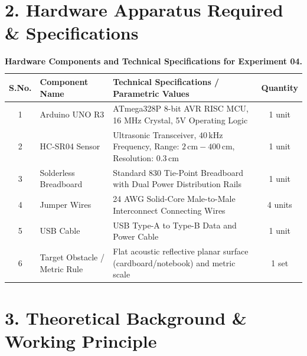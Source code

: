 \documentclass[10pt,a4paper]{article}
\begin{document}
\section*{2. Hardware Apparatus Required \& Specifications}
\begin{table}[H]
\centering
\footnotesize
\renewcommand{\arraystretch}{1.15}
\begin{tabularx}{\textwidth}{|c|l|X|c|}
\hline
\textbf{S.No.} & \textbf{Component Name} & \textbf{Technical Specifications / Parametric Values} & \textbf{Quantity} \\
\hline
1 & Arduino UNO R3 & ATmega328P 8-bit AVR RISC MCU, 16 MHz Crystal, 5V Operating Logic & 1 unit \\
2 & HC-SR04 Sensor & Ultrasonic Transceiver, $40\,\text{kHz}$ Frequency, Range: $2\,\text{cm} - 400\,\text{cm}$, Resolution: $0.3\,\text{cm}$ & 1 unit \\
3 & Solderless Breadboard & Standard 830 Tie-Point Breadboard with Dual Power Distribution Rails & 1 unit \\
4 & Jumper Wires & 24 AWG Solid-Core Male-to-Male Interconnect Connecting Wires & 4 units \\
5 & USB Cable & USB Type-A to Type-B Data and Power Cable & 1 unit \\
6 & Target Obstacle / Metric Rule & Flat acoustic reflective planar surface (cardboard/notebook) and metric scale & 1 set \\
\hline
\end{tabularx}
\caption{\textbf{Hardware Components and Technical Specifications for Experiment 04.}}
\end{table}

\section*{3. Theoretical Background \& Working Principle}
\end{document}

